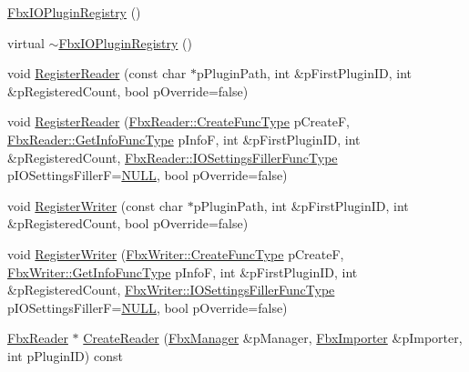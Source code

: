 \begin{DoxyCompactItemize}
\item 
\hyperlink{class_fbx_i_o_plugin_registry_a126c1065aa202f7469a54ad465195f9e}{Fbx\+I\+O\+Plugin\+Registry} ()
\item 
virtual \hyperlink{class_fbx_i_o_plugin_registry_a0feb5b0aeb86e2f7c981aeb97576c83f}{$\sim$\+Fbx\+I\+O\+Plugin\+Registry} ()
\item 
void \hyperlink{class_fbx_i_o_plugin_registry_ae10f86ccbad4d0c3eac81f98c1d880ac}{Register\+Reader} (const char $\ast$p\+Plugin\+Path, int \&p\+First\+Plugin\+ID, int \&p\+Registered\+Count, bool p\+Override=false)
\item 
void \hyperlink{class_fbx_i_o_plugin_registry_a3ae89a412d7d44ddea5ef3d26105c37d}{Register\+Reader} (\hyperlink{class_fbx_reader_a83acaa910ced3876e5e232ff17f62c45}{Fbx\+Reader\+::\+Create\+Func\+Type} p\+CreateF, \hyperlink{class_fbx_reader_a86477804a6ed54e7f99a1887aa50f256}{Fbx\+Reader\+::\+Get\+Info\+Func\+Type} p\+InfoF, int \&p\+First\+Plugin\+ID, int \&p\+Registered\+Count, \hyperlink{class_fbx_reader_aa8d17b6ac89ea7229a3a1510fbccec73}{Fbx\+Reader\+::\+I\+O\+Settings\+Filler\+Func\+Type} p\+I\+O\+Settings\+FillerF=\hyperlink{fbxarch_8h_a070d2ce7b6bb7e5c05602aa8c308d0c4}{N\+U\+LL}, bool p\+Override=false)
\item 
void \hyperlink{class_fbx_i_o_plugin_registry_ad3c828b59a5ed63b1d4e37ef8657639d}{Register\+Writer} (const char $\ast$p\+Plugin\+Path, int \&p\+First\+Plugin\+ID, int \&p\+Registered\+Count, bool p\+Override=false)
\item 
void \hyperlink{class_fbx_i_o_plugin_registry_a41cfa9410a68bcd77d1fa8181df05703}{Register\+Writer} (\hyperlink{class_fbx_writer_aa634a7d29a01f8197f814437644e845b}{Fbx\+Writer\+::\+Create\+Func\+Type} p\+CreateF, \hyperlink{class_fbx_writer_a6c13529045946d474e1e69fa0a6b9305}{Fbx\+Writer\+::\+Get\+Info\+Func\+Type} p\+InfoF, int \&p\+First\+Plugin\+ID, int \&p\+Registered\+Count, \hyperlink{class_fbx_writer_a43eb86f1aae1a6a424c54bcf294553c5}{Fbx\+Writer\+::\+I\+O\+Settings\+Filler\+Func\+Type} p\+I\+O\+Settings\+FillerF=\hyperlink{fbxarch_8h_a070d2ce7b6bb7e5c05602aa8c308d0c4}{N\+U\+LL}, bool p\+Override=false)
\item 
\hyperlink{class_fbx_reader}{Fbx\+Reader} $\ast$ \hyperlink{class_fbx_i_o_plugin_registry_ab7960a51f7036080668313f6144e4ccd}{Create\+Reader} (\hyperlink{class_fbx_manager}{Fbx\+Manager} \&p\+Manager, \hyperlink{class_fbx_importer}{Fbx\+Importer} \&p\+Importer, int p\+Plugin\+ID) const
\item 

\end{DoxyCompactItemize}
